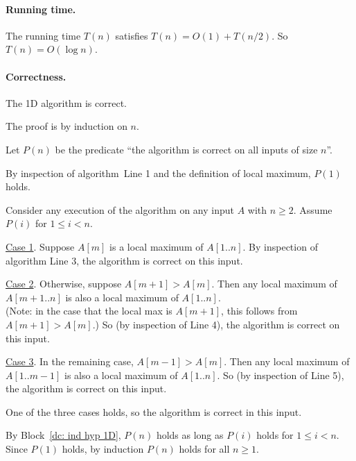 \paragraph{Running time.}
The running time $T(n)$ satisfies $T(n) = O(1) + T(n/2)$.  So $T(n) = O(\log n)$.

\paragraph{Correctness.}

\begin{lemma}
  The 1D algorithm is correct.
\end{lemma}
\begin{longFormProof}
  \step The proof is by induction on $n$.

  \step Let $P(n)$ be the predicate ``the algorithm is correct on all inputs of size $n$''.

  \step By inspection of algorithm~Line 1 and the definition of local maximum, $P(1)$ holds.

  \begin{block}
    \step Consider any execution of the algorithm on any input $A$ with $n\ge 2$.
    Assume $P(i)$ for $1\le i < n$.

    \begin{block}[dc: X]
      \step \underline{Case 1}.
      Suppose $A[m]$ is a local maximum of $A[1..n]$.
      \step By inspection of algorithm Line 3, the algorithm is correct on this input.
    \end{block}
    \begin{block}
      \step \underline{Case 2}.
      Otherwise, suppose $A[m+1] > A[m]$.
      \step Then any local maximum of $A[m+1..n]$ is also a local maximum of $A[1..n]$.
      \\ (Note: in the case that the local max is $A[m+1]$, this follows from $A[m+1] > A[m]$.)
      \step So (by inspection of Line 4), the algorithm is correct on this input.
    \end{block}
    \begin{block}
      \step \underline{Case 3}. In the remaining case, $A[m-1] > A[m]$.
      \step Then any local maximum of $A[1..m-1]$ is also a local maximum of $A[1..n]$.
      \step So (by inspection of Line 5), the algorithm is correct on this input.
    \end{block}
    \step One of the three cases holds, so the algorithm is correct in this input.
  \end{block}
  \step By Block~\ref{dc: ind hyp 1D}, $P(n)$ holds as long as $P(i)$ holds for $1\le i < n$.
  \step Since $P(1)$ holds, by induction $P(n)$ holds for all $n\ge 1$.
\end{longFormProof}


